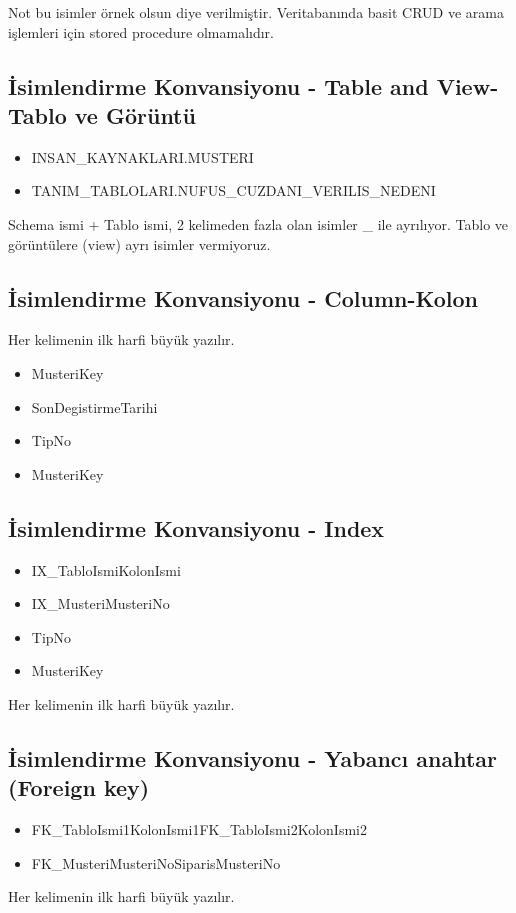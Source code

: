 \documentclass[10pt,a4paper,draft]{article}
\begin{document}
Not bu isimler örnek olsun diye verilmiştir. 
Veritabanında basit CRUD ve arama işlemleri için stored procedure olmamalıdır.

\subsection{İsimlendirme Konvansiyonu - Table and View-Tablo ve Görüntü}  

\begin{itemize}
\item INSAN\_KAYNAKLARI.MUSTERI 
\item TANIM\_TABLOLARI.NUFUS\_CUZDANI\_VERILIS\_NEDENI
\end{itemize}  

Schema ismi + Tablo ismi, 2 kelimeden fazla olan isimler \_ ile ayrılıyor. 
Tablo ve görüntülere (view) ayrı isimler vermiyoruz.		  

\subsection{İsimlendirme Konvansiyonu - Column-Kolon}  
Her kelimenin ilk harfi büyük yazılır. 
\begin{itemize}
\item MusteriKey 
\item SonDegistirmeTarihi
\item TipNo
\item MusteriKey
\end{itemize}  


\subsection{İsimlendirme Konvansiyonu - Index}  
\begin{itemize}
\item IX\_TabloIsmiKolonIsmi 
\item IX\_MusteriMusteriNo
\item TipNo
\item MusteriKey
\end{itemize}  
Her kelimenin ilk harfi büyük yazılır.

\subsection{İsimlendirme Konvansiyonu - Yabancı anahtar (Foreign key)}  
\begin{itemize}
\item  FK\_TabloIsmi1KolonIsmi1FK\_TabloIsmi2KolonIsmi2 
\item FK\_MusteriMusteriNoSiparisMusteriNo
\end{itemize}
Her kelimenin ilk harfi büyük yazılır. 
  
\end{document}
